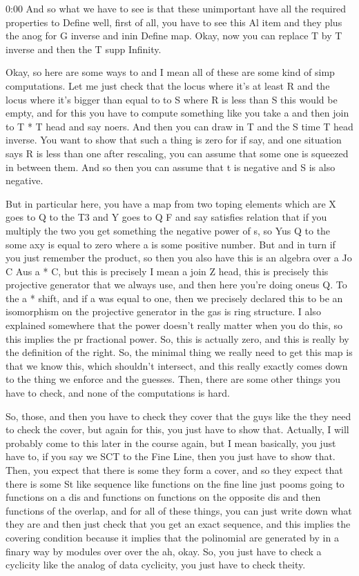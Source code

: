 \begin{unfinished}{0:00}
And so what we have to see is that these unimportant have all the required properties to Define well, first of all, you have to see this Al item and they plus the anog for G inverse and inin Define map. Okay, now you can replace T by T inverse and then the T supp Infinity.

Okay, so here are some ways to and I mean all of these are some kind of simp computations. Let me just check that the locus where it's at least R and the locus where it's bigger than equal to to S where R is less than S this would be empty, and for this you have to compute something like you take a and then join to T * T head and say noers. And then you can draw in T and the S time T head inverse. You want to show that such a thing is zero for if say, and one situation says R is less than one after rescaling, you can assume that some one is squeezed in between them. And so then you can assume that t is negative and S is also negative.

But in particular here, you have a map from two toping elements which are X goes to Q to the T3 and Y goes to Q F and say satisfies relation that if you multiply the two you get something the negative power of s, so Yus Q to the some axy is equal to zero where a is some positive number. But and in turn if you just remember the product, so then you also have this is an algebra over a Jo C Aus a * C, but this is precisely I mean a join Z head, this is precisely this projective generator that we always use, and then here you're doing oneus Q.
To the a * shift, and if a was equal to one, then we precisely declared this to be an isomorphism on the projective generator in the gas is ring structure. I also explained somewhere that the power doesn't really matter when you do this, so this implies the pr fractional power. So, this is actually zero, and this is really by the definition of the right. So, the minimal thing we really need to get this map is that we know this, which shouldn't intersect, and this really exactly comes down to the thing we enforce and the guesses. Then, there are some other things you have to check, and none of the computations is hard.

So, those, and then you have to check they cover that the guys like the they need to check the cover, but again for this, you just have to show that. Actually, I will probably come to this later in the course again, but I mean basically, you just have to, if you say we SCT to the Fine Line, then you just have to show that. Then, you expect that there is some they form a cover, and so they expect that there is some St like sequence like functions on the fine line just pooms going to functions on a dis and functions on functions on the opposite dis and then functions of the overlap, and for all of these things, you can just write down what they are and then just check that you get an exact sequence, and this implies the covering condition because it implies that the polinomial are generated by in a finary way by modules over over the ah, okay. So, you just have to check a cyclicity like the analog of data cyclicity, you just have to check theity.


\end{unfinished}
